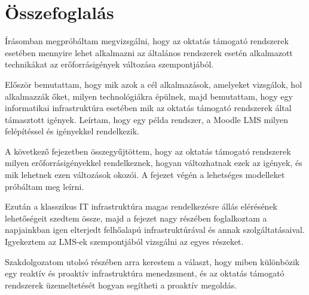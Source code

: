 \chapter{Összefoglalás}

Írásomban megpróbáltam megvizsgálni, hogy az oktatás támogató rendszerek esetében mennyire lehet alkalmazni az általános rendszerek esetén alkalmazott technikákat az erőforrásigények változása szempontjából.

Először bemutattam, hogy mik azok a cél alkalmazások, amelyeket vizsgálok, hol alkalmazzák őket, milyen technológiákra épülnek, majd bemutattam, hogy egy informatikai infrastruktúra esetében mik az oktatás támogató rendszerek által támasztott igények. Leírtam, hogy egy példa rendszer, a Moodle LMS milyen felépítéssel és igényekkel rendelkezik.

A következő fejezetben összegyűjtöttem, hogy az oktatás támogató rendszerek milyen erőforrásigényekkel rendelkeznek, hogyan változhatnak ezek az igények, és mik lehetnek ezen változások okozói. A fejezet végén a lehetséges modelleket próbáltam meg leírni.

Ezután a klasszikus IT infrastruktúra magas rendelkezésre állás elérésének lehetőségeit szedtem össze, majd a fejezet nagy részében foglalkoztam a napjainkban igen elterjedt felhőalapú infrastruktúrával és annak szolgáltatásaival. Igyekeztem az LMS-ek szempontjából vizsgálni az egyes részeket.

Szakdolgozatom utolsó részében arra kerestem a választ, hogy miben különbözik egy reaktív és proaktív infrastruktúra menedzsment, és az oktatás támogató rendszerek üzemeltetését hogyan segítheti a proaktív megoldás.

